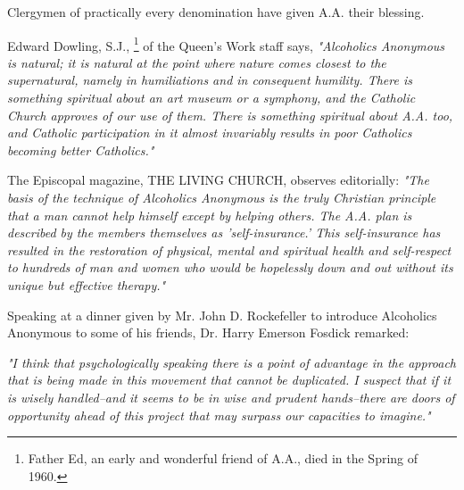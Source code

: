 

\bbChapterPreamble


\begin{biblechapter}
    Clergymen of practically every denomination 
    have given A.A. their blessing.

    Edward Dowling, S.J.,
    \footnote{Father Ed, an early and wonderful friend of A.A., died in the Spring of 1960.}
    of the Queen's Work staff says,
\verse\emph{ "Alcoholics Anonymous is natural; 
    it is natural at the point where nature 
    comes closest to the supernatural,
    namely in humiliations and in consequent humility.
\verse There is something spiritual about an art museum or a symphony, 
    and the Catholic Church approves of our use of them.
\verse There is something spiritual about A.A. too, 
    and Catholic participation in it almost invariably results 
    in poor Catholics becoming better Catholics."
}

    The Episcopal magazine, THE LIVING CHURCH, observes editorially: 
\verse\emph{ "The basis of the technique of Alcoholics Anonymous 
    is the truly Christian principle 
    that a man cannot help himself except by helping others.
    The A.A. plan is described by the members themselves as 
    'self-insurance.'
\verse This self-insurance has resulted in the restoration of 
    physical, mental and spiritual health 
    and self-respect to hundreds of man and women 
    who would be hopelessly down and out 
    without its unique but effective therapy."
}

    Speaking at a dinner given by Mr. John D. Rockefeller 
    to introduce Alcoholics Anonymous to some of his friends,
    Dr. Harry Emerson Fosdick remarked:

\verse\emph{"I think that psychologically speaking 
    there is a point of advantage 
    in the approach that is being made in this movement 
    that cannot be duplicated.
\verse I suspect that if it is wisely handled--and 
    it seems to be in wise and prudent hands--there 
    are doors of opportunity ahead of this project 
    that may surpass our capacities to imagine."
}


\end{biblechapter}
